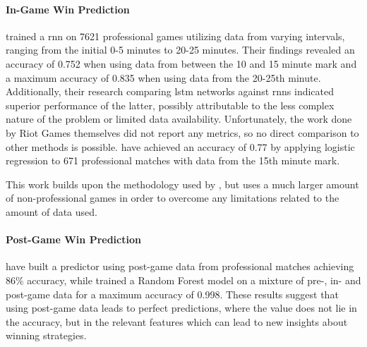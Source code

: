 \documentclass[12pt, a4paper, headinclude, twoside, plainheadsepline, open=right, numbers=noenddot, hidelinks, toc=listof, toc=bibliography]{scrreprt}
\begin{document}
\paragraph{In-Game Win Prediction}
 \cite{silvaContinuousOutcomePrediction2018} trained a \acf{rnn} on 7621 professional games  utilizing data from varying intervals, ranging from the initial 0-5 minutes to 20-25 minutes.
Their findings revealed an accuracy of 0.752 when using data from between the 10 and 15 minute mark and a maximum accuracy of 0.835 when using data from the 20-25th minute.
Additionally, their research comparing \ac{lstm} networks against \acp{rnn} indicated superior performance of the latter, possibly attributable to the less complex nature of the problem or limited data availability.
Unfortunately, the work done by Riot Games themselves \cite{claytorRiotGamesAWS2023} did not report any metrics, so no direct comparison to other methods is possible.
\citeauthor{baileyStatisticalLearningEsports} \cite{baileyStatisticalLearningEsports} have achieved an accuracy of 0.77 by applying logistic regression to 671 professional matches with data from the 15th minute mark.

This work builds upon the methodology used by   \cite{silvaContinuousOutcomePrediction2018}, but uses a much larger amount of non-professional games in order to overcome any limitations related to the amount of data used.

\paragraph{Post-Game Win Prediction}
\citeauthor{bahrololloomiESportsPlayerPerformance2023} \cite{bahrololloomiESportsPlayerPerformance2023} have built a predictor using post-game data from professional matches achieving 86\% accuracy, while \citeauthor{aniVictoryPredictionLeague2019} \cite{aniVictoryPredictionLeague2019} trained a Random Forest model on a mixture of pre-, in- and post-game data for a maximum accuracy of 0.998.
These results suggest that using post-game data leads to perfect predictions, where the value does not lie in the accuracy, but in the relevant features which can lead to new insights about winning strategies.
\end{document}
